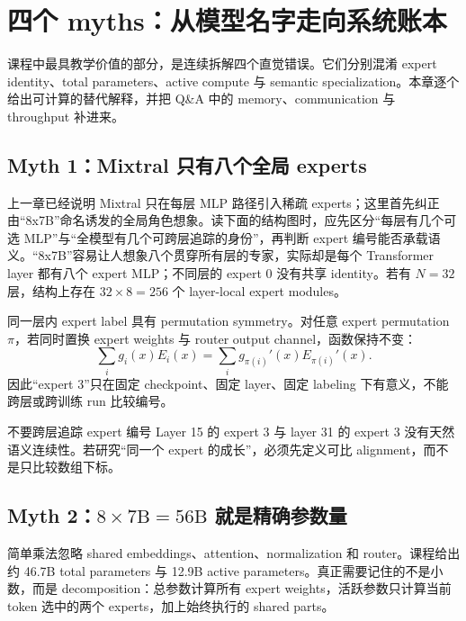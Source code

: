 \section{四个 myths：从模型名字走向系统账本}

课程中最具教学价值的部分，是连续拆解四个直觉错误。它们分别混淆 expert identity、total parameters、active compute 与 semantic specialization。本章逐个给出可计算的替代解释，并把 Q\&A 中的 memory、communication 与 throughput 补进来。

\subsection{Myth 1：Mixtral 只有八个全局 experts}

上一章已经说明 Mixtral 只在每层 MLP 路径引入稀疏 experts；这里首先纠正由“8x7B”命名诱发的全局角色想象。读下面的结构图时，应先区分“每层有几个可选 MLP”与“全模型有几个可跨层追踪的身份”，再判断 expert 编号能否承载语义。“8x7B”容易让人想象八个贯穿所有层的专家，实际却是每个 Transformer layer 都有八个 expert MLP；不同层的 expert 0 没有共享 identity。若有 $N=32$ 层，结构上存在 $32\times 8=256$ 个 layer-local expert modules。


同一层内 expert label 具有 permutation symmetry。对任意 expert permutation $\pi$，若同时置换 expert weights 与 router output channel，函数保持不变：
\[
\sum_i g_i(x)E_i(x)=\sum_i g_{\pi(i)}'(x)E_{\pi(i)}'(x).
\]
因此“expert 3”只在固定 checkpoint、固定 layer、固定 labeling 下有意义，不能跨层或跨训练 run 比较编号。


\begin{warningbox}{不要跨层追踪 expert 编号}
Layer 15 的 expert 3 与 layer 31 的 expert 3 没有天然语义连续性。若研究“同一个 expert 的成长”，必须先定义可比 alignment，而不是只比较数组下标。
\end{warningbox}

\subsection{Myth 2：\texorpdfstring{$8\times 7\mathrm{B}=56\mathrm{B}$}{8 x 7B = 56B} 就是精确参数量}

简单乘法忽略 shared embeddings、attention、normalization 和 router。课程给出约 46.7B total parameters 与 12.9B active parameters。真正需要记住的不是小数，而是 decomposition：总参数计算所有 expert weights，活跃参数只计算当前 token 选中的两个 experts，加上始终执行的 shared parts。

